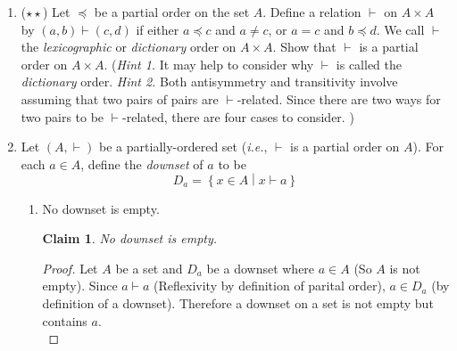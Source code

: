 \documentclass[11pt]{letter}
\newtheorem{claim}{Claim}
\theoremstyle{definition}
\begin{document}
\begin{enumerate}
\begin{proof}
                    Transitive: $(a,c)\in R$ (Since R is transitive). So $(c,b),(b,a)\in R$ (inverses of $(a,b)$ and $(b,c)$). Therefore if $R$ is transitive, $(c,a)\in R$. Since $(c,a)\in R$ (inverse of $(a,c)$), $R^{-1}$ is transitive.\\
                    Antisymmetric: If $(a,b),(b,a)\in R$, $a=b$. Therefore if $(b,a),(a,b)\in R^{-1}$, $a=b$. So $R^{-1}$ is symmetric.\\
                    So $R^{-1}$ is a partial order.
                  \end{proof}
        	\item ($\star\star$) Let $\preceq$ be a partial order on the set $A$. Define a relation $\vdash$ on $A\times A$ by $(a,b)\vdash (c,d)$ if either $a\preceq c$ and $a\neq c$, or $a=c$ and $b\preceq d$. We call $\vdash$ the {\em lexicographic} or {\em dictionary} order on $A\times A$. Show that $\vdash$ is a partial order on $A\times A$. ({\em Hint 1.} It may help to consider why $\vdash$ is called the {\em dictionary} order. {\em Hint 2.} Both antisymmetry and transitivity involve assuming that two pairs of pairs are $\vdash$-related.  Since there are two ways for two pairs to be $\vdash$-related, there are four cases to consider. )
		\item Let $(A, \vdash)$ be a partially-ordered set ({\em i.e.}, $\vdash$ is a partial order on $A$). For each $a\in A$, define the {\em downset} of $a$ to be $$D_a=\left\{x\in A\middle\vert x\vdash a\right\}$$
			\begin{enumerate}
			\item No downset is empty.
                          \begin{claim}
                            No downset is empty.
                          \end{claim}
                          \begin{proof}
                            Let $A$ be a set and $D_a$ be a downset where $a\in A$ (So $A$ is not empty). Since $a\vdash a$ (Reflexivity by definition of parital order), $a\in D_a$ (by definition of a downset). Therefore a downset on a set is not empty but contains $a$.\\
                           

\end{proof}
\end{enumerate}
\end{enumerate}
\end{document}
